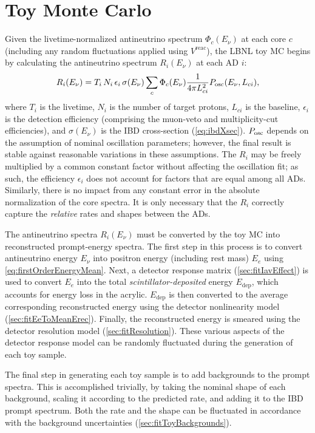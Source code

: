 \documentclass[../thesis.tex]{subfiles}
\begin{document}
\section{Toy Monte Carlo}
\label{sec:fittingToyMC}

Given the livetime-normalized antineutrino spectrum $\Phi_c(E_\nu)$ at each core $c$ (including any random fluctuations applied using $V^{\mathrm{reac}}$), the LBNL toy MC begins by calculating the antineutrino spectrum $R_i(E_\nu)$ at each AD $i$:
\begin{equation}
  \label{eq:fitTrueIbdSpecOverview}
  R_i(E_\nu) = T_i\,N_i\,\epsilon_i\,\sigma(E_\nu) \sum_c \Phi_c(E_\nu) \frac{1}{4\pi L_{ci}^2}
  P_\mathrm{osc}(E_\nu, L_{ci}),
\end{equation}
where $T_i$ is the livetime, $N_i$ is the number of target protons, $L_{ci}$ is the baseline, $\epsilon_i$ is the detection efficiency (comprising the muon-veto and multiplicity-cut efficiencies), and $\sigma(E_\nu)$ is the IBD cross-section (\autoref{eq:ibdXsec}). $P_\mathrm{osc}$ depends on the assumption of nominal oscillation parameters; however, the final result is stable against reasonable variations in these assumptions. The $R_i$ may be freely multiplied by a common constant factor without affecting the oscillation fit; as such, the efficiency $\epsilon_i$ does not account for factors that are equal among all ADs. Similarly, there is no impact from any constant error in the absolute normalization of the core spectra. It is only necessary that the $R_i$ correctly capture the \emph{relative} rates and shapes between the ADs.

The antineutrino spectra $R_i(E_\nu)$ must be converted by the toy MC into reconstructed prompt-energy spectra. The first step in this process is to convert antineutrino energy $E_\nu$ into positron energy (including rest mass) $E_e$ using \autoref{eq:firstOrderEnergyMean}. Next, a detector response matrix (\autoref{sec:fitIavEffect}) is used to convert $E_e$ into the total \emph{scintillator-deposited} energy $E_{\mathrm{dep}}$, which accounts for energy loss in the acrylic. $E_{\mathrm{dep}}$ is then converted to the average corresponding reconstructed energy using the detector nonlinearity model (\autoref{sec:fitEeToMeanErec}). Finally, the reconstructed energy is smeared using the detector resolution model (\autoref{sec:fitResolution}). These various aspects of the detector response model can be randomly fluctuated during the generation of each toy sample.

The final step in generating each toy sample is to add backgrounds to the prompt spectra. This is accomplished trivially, by taking the nominal shape of each background, scaling it according to the predicted rate, and adding it to the IBD prompt spectrum. Both the rate and the shape can be fluctuated in accordance with the background uncertainties (\autoref{sec:fitToyBackgrounds}).
\end{document}
